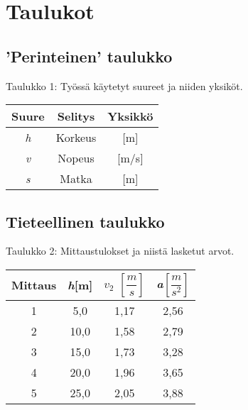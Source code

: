 \section{Taulukot}
\subsection{'Perinteinen' taulukko}
\begin{center}
Taulukko 1: Työssä käytetyt suureet ja niiden yksiköt.
\begin{tabular}[h]{|c|c|c|}
	\hline
	Suure & Selitys & Yksikkö \\
	\hline
	\textit{h} & Korkeus & [m] \\
	\hline
	\textit{v} & Nopeus & [m/s] \\
	\hline
	\textit{s} & Matka & [m] \\
	\hline

\end{tabular}
\end{center}
\subsection{Tieteellinen taulukko}
\begin{center}
Taulukko 2: Mittaustulokset ja niistä lasketut arvot.

\begin{tabular}[h]{c|c|c|c}
	Mittaus & \textit{h}[m] & \textit{$v_2$} $[\dfrac{m}{s}]$ & \textit{a}$[\dfrac{m}{s^2}]$ \\
	\hline
	1	& 5,0 	& 1,17 	& 2,56 \\
	2  	& 10,0 	& 1,58 	& 2,79 \\
	3 	& 15,0	& 1,73	& 3,28 \\
	4	& 20,0	& 1,96	& 3,65 \\
	5 	& 25,0	& 2,05	& 3,88 \\
\end{tabular}

\end{center}
\newpage
